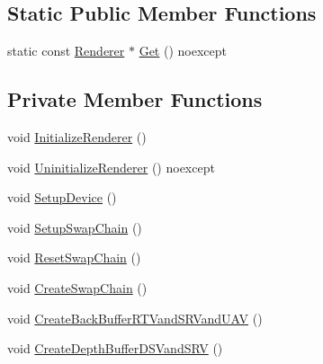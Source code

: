 \subsection*{Static Public Member Functions}
\begin{DoxyCompactItemize}
\item 
static const \hyperlink{classmage_1_1_renderer}{Renderer} $\ast$ \hyperlink{classmage_1_1_renderer_a84ad465ae4ecfa2c0e9334cadb82d269}{Get} () noexcept
\end{DoxyCompactItemize}
\subsection*{Private Member Functions}
\begin{DoxyCompactItemize}
\item 
void \hyperlink{classmage_1_1_renderer_a2bb7f4e41ef6db047ce3023ed4e5d0c1}{Initialize\+Renderer} ()
\item 
void \hyperlink{classmage_1_1_renderer_a28c76b49e51e49e58fdeb0b72b12f3b6}{Uninitialize\+Renderer} () noexcept
\item 
void \hyperlink{classmage_1_1_renderer_aedf5e2e3f73d3d05c09c5fc9f8ac06c3}{Setup\+Device} ()
\item 
void \hyperlink{classmage_1_1_renderer_a8d3030611390f69120f1e5b91225eddf}{Setup\+Swap\+Chain} ()
\item 
void \hyperlink{classmage_1_1_renderer_a1c4615559503b339a9cdc6ac17e1e858}{Reset\+Swap\+Chain} ()
\item 
void \hyperlink{classmage_1_1_renderer_a1bd77bf54ea3a7867691785efd183013}{Create\+Swap\+Chain} ()
\item 
void \hyperlink{classmage_1_1_renderer_a4d89de59be7674cbdb11c37c7b04d94a}{Create\+Back\+Buffer\+R\+T\+Vand\+S\+R\+Vand\+U\+AV} ()
\item 
void \hyperlink{classmage_1_1_renderer_afe5bf4339a31eda5a14d1da48fcfe0e9}{Create\+Depth\+Buffer\+D\+S\+Vand\+S\+RV} ()
\end{DoxyCompactItemize}
